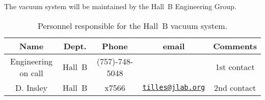 The vacuum system will be maintained by the Hall~B Engineering Group.  

\begin{table}[!htb]
\centering
\begin{tabular}{|c|c|c|c|c|} \hline
Name&Dept.&Phone&email&Comments \\ \hline
Engineering on call & Hall~B& (757)-748-5048&& 1st contact  \\ \hline
D. Insley & Hall~B & x7566&\href{mailto:tilles@jlab.org}{\nolinkurl{tilles@jlab.org}}&2nd contact \\ \hline
 \end{tabular}
\caption{Personnel responsible for the Hall~B vacuum system.} 
\label{tb:vacuum}
\end{table}

